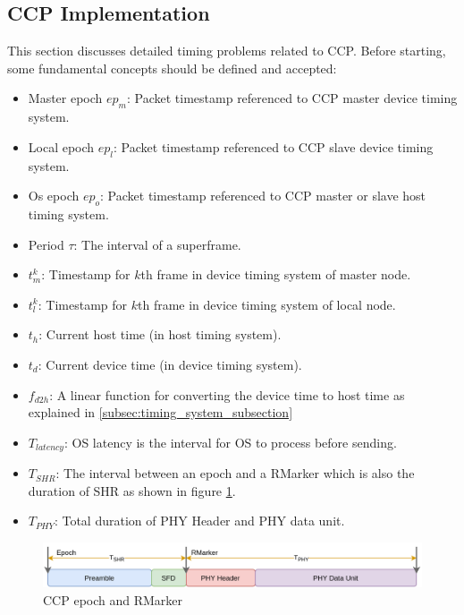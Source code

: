 \documentclass[\main/thesis.tex]{subfiles}
\begin{document}
\subsection{CCP Implementation}
This section discusses detailed timing problems related to CCP. Before starting, some fundamental concepts should be defined and accepted:
\begin{itemize}
    \item Master epoch $ep_m$: Packet timestamp referenced to CCP master device timing system.
    \item Local epoch $ep_l$: Packet timestamp referenced to CCP slave device timing system.
    \item Os epoch $ep_o$: Packet timestamp referenced to CCP master or slave host timing system.
    \item Period $\tau$: The interval of a superframe.
    \item $t^k_{m}$: Timestamp for $k$th frame in device timing system of master node.
    \item $t^k_{l}$: Timestamp for $k$th frame in device timing system of local node.
    \item $t_h$: Current host time (in host timing system).
    \item $t_d$: Current device time (in device timing system).
    \item $f_{d2h}$: A linear function for converting the device time to host time as explained in \ref{subsec:timing_system_subsection}
    \item $T_{latency}$: OS latency is the interval for OS to process before sending.
    \item $T_{SHR}$: The interval between an epoch and a RMarker which is also the duration of SHR as shown in figure \ref{fig:ccp_epoch_and_rmarker}.
    \item $T_{PHY}$: Total duration of PHY Header and PHY data unit.
\end{itemize}
\begin{figure}[H]
    \begin{center}
        \includegraphics[scale=0.35]{ccp_epoch_and_rmarker.png}
    \end{center}
    \caption{CCP epoch and RMarker}
    \label{fig:ccp_epoch_and_rmarker}
\end{figure}
\end{document}
